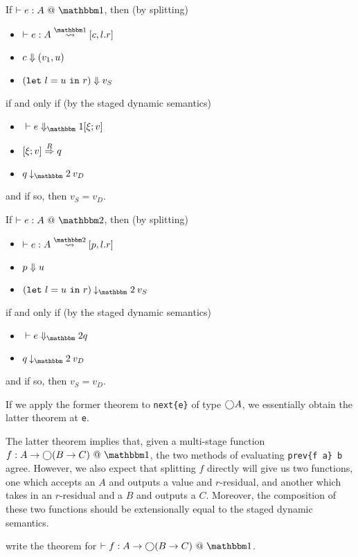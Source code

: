 \begin{theorem}
If $\vdash e:A~@~\bbone$, then (by splitting)
\begin{itemize}
\item $\vdash e : A \splitonesym [c,l.r]$
\item ${c} \Downarrow {(v_1,u)}$
\item ${({\tt let}~{l} = {u}~{\tt in}~{r})} \Downarrow {v}_S$
\end{itemize}
if and only if (by the staged dynamic semantics)
\begin{itemize}
\item $\diaone [] e {\xi;v}$
\item $[{\xi};{v}]\overset{R}\Rightarrow{q}$
\item $q \mathbin{\tworedsym} v_D$
\end{itemize}
and if so, then $v_S = v_D$.
\end{theorem}

\begin{theorem}
If $\vdash e:A~@~\bbtwo$, then (by splitting)
\begin{itemize}
\item $\vdash e : A \splittwosym [p,l.r]$
\item ${p} \Downarrow {u}$
\item $(\letin{l}{u}{r}) \mathbin{\tworedsym} v_S$
\end{itemize}
if and only if (by the staged dynamic semantics)
\begin{itemize}
\item $\diatwo [] e q$
\item $q \mathbin{\tworedsym} v_D$
\end{itemize}
and if so, then $v_S = v_D$.
\end{theorem}

If we apply the former theorem to \verb|next{e}| of type $\bigcirc A$, we
essentially obtain the latter theorem at \verb|e|.

The latter theorem implies that, given a multi-stage function $f:A\to\fut(B\to
C)~@~\bbone$, the two methods of evaluating \verb|prev{f a} b| agree.
However, we also expect that splitting $f$ directly will give us two functions,
one which accepts an $A$ and outputs a value and $r$-residual, and another which
takes in an $r$-residual and a $B$ and outputs a $C$. Moreover, the composition
of these two functions should be extensionally equal to the staged dynamic
semantics.

\TODO write the theorem for $\vdash f:A\to\fut(B\to C)~@~\bbone$.

